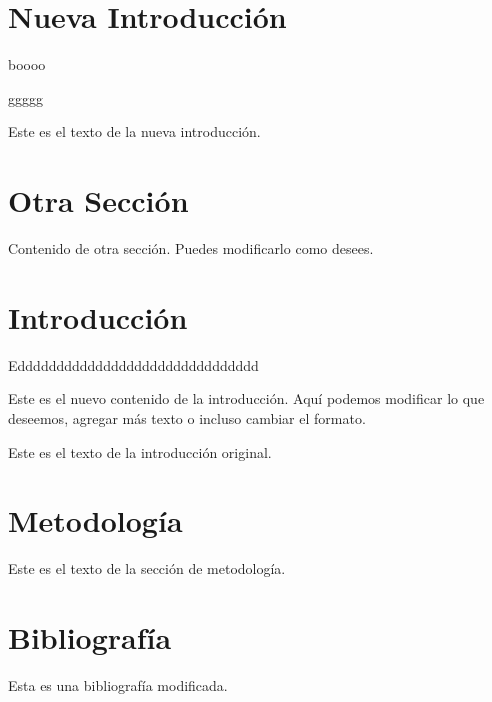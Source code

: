 \documentclass{article}%
\begin{document}
%
\normalsize%



\section{Nueva Introducción}
{
boooo

ggggg
}
\label{sec:NuevaIntroduccin}%
Este es el texto de la nueva introducción.

%
\section{Otra Sección}%
\label{sec:OtraSeccin}%
Contenido de otra sección. Puedes modificarlo como desees.




\section{Introducción}
Eddddddddddddddddddddddddddddddd

Este es el nuevo contenido de la introducción. Aquí podemos modificar lo que deseemos, 
agregar más texto o incluso cambiar el formato.

Este es el texto de la introducción original.

\section{Metodología}
Este es el texto de la sección de metodología.
%
\section{Bibliografía}%
Esta es una bibliografía modificada.%
\end{document}
